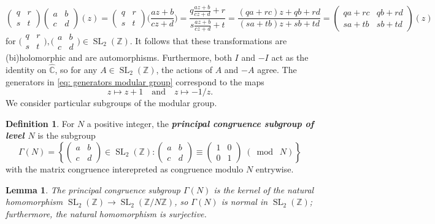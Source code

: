 \documentclass[10pt,leqno]{article}
\theoremstyle{plain}
\newtheorem{lemma}[lem]{Lemma}
\theoremstyle{definition}
\newtheorem{definition}[lem]{Definition}
\numberwithin{equation}{section}
\numberwithin{lem}{section}
\newcommand{\cbr}[1]{\left\{#1\right\}}
\newcommand{\textib}[1]{\textbf{\textit{#1}}}
\DeclareMathOperator{\SL}{SL}
\newcommand{\smod}[1]{\;(\bmod\; #1)}
\newcommand{\abcd}{\begin{pmatrix}
    a & b \\ c & d
\end{pmatrix}}
\newcommand{\slz}{\SL_2(\mathbb{Z})}
\begin{document}
\[\begin{pmatrix}
    q & r \\ s & t
\end{pmatrix}\abcd(z) = \begin{pmatrix}
    q & r \\ s & t
\end{pmatrix}\Big(\frac{az+b}{cz+d}\Big) = \frac{q\frac{az+b}{cz+d}+r}{s\frac{az+b}{cz+d}+t} = \frac{(qa+rc)z+qb+rd}{(sa+tb)z+sb+td} = \begin{pmatrix}
    qa+rc & qb+rd \\ sa+tb & sb+td
\end{pmatrix}(z)\] for $\big(\!\begin{smallmatrix}
    q & r \\ s & t
\end{smallmatrix}\!\big),\big(\!\begin{smallmatrix}
    a & b \\ c & d
\end{smallmatrix}\!\big)\in \slz$.
It follows that these transformations are (bi)holomorphic and are automorphisms.
Furthermore, both $I$ and $-I$ act as the identity on $\widehat{\mathbb{C}}$, so for any $A\in \slz$, the actions of $A$ and $-A$ agree. The generators in \cref{eq: generators modular group} correspond to the maps
\[z\mapsto z+1\quad\text{and}\quad z\mapsto -1/z.\]
We consider particular subgroups of the modular group. 
\begin{definition}
    For $N$ a positive integer, the \textib{principal congruence subgroup of level $N$} is the subgroup
\[\varGamma(N) = \cbr{\abcd\in \slz: \abcd\equiv \begin{pmatrix}
    1 & 0 \\ 0 & 1
\end{pmatrix}\smod N}\]
with the matrix congruence interepreted as congruence modulo $N$ entrywise.
\end{definition}
\begin{lemma}\label{lem: varGamma(N) kernel of projection}
    The principal congruence subgroup $\varGamma(N)$ is the kernel of the natural homomorphism $\slz\to \SL_2(\mathbb{Z}/N\mathbb{Z})$, so $\varGamma(N)$ is normal in $\slz$; furthermore, the natural homomorphism is surjective.
\end{lemma}
\end{document}

